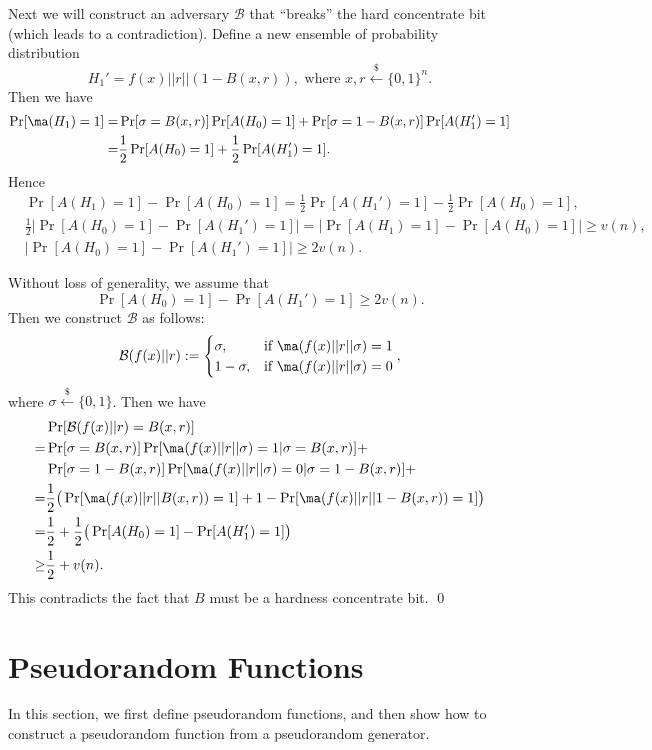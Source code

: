 Next we will construct an adversary $\mathcal{B}$ that ``breaks'' the hard concentrate bit (which leads to a contradiction).
Define a new ensemble of probability distribution
\[
H_1' = f(x) || r || (1-B(x, r)) , \text{ where } x, r \xleftarrow{\$} \{0, 1\}^n.
\]
Then we have
\begin{align*}
\Pr[\ma(H_1) = 1]
=& \Pr[\sigma = B(x, r)] \Pr[A(H_0) = 1] + \Pr[\sigma = 1 - B(x, r)] \Pr[A(H_1') = 1]\\
=& \frac{1}{2} \Pr[A(H_0) = 1] + \frac{1}{2}\Pr[A(H_1') = 1].
\end{align*}
Hence
\begin{align*}
&\Pr[A(H_1) = 1] - \Pr[A(H_0) = 1]
=  \frac{1}{2}\Pr[A(H_1') = 1] - \frac{1}{2} \Pr[A(H_0) = 1],
\\
&\frac{1}{2} \left|\Pr[A(H_0) = 1] - \Pr[A(H_1') = 1] \right|
= \left| \Pr[A(H_1) = 1] - \Pr[A(H_0) = 1] \right|
\geq v(n),
\\
&\left|\Pr[A(H_0) = 1] - \Pr[A(H_1') = 1] \right|
\geq 2v(n).
\end{align*}

Without loss of generality, we assume that
\[
\Pr[A(H_0) = 1] - \Pr[A(H_1') = 1]
\geq 2v(n).
\]
Then we construct $\mathcal{B}$ as follows:
\[
\mathcal{B}(f(x)|| r) :=
\begin{cases}
\sigma, & \text{if } \ma(f(x)|| r||\sigma) = 1\\
1 - \sigma, & \text{if } \ma(f(x)||r|| \sigma) = 0
\end{cases},
\]
where $\sigma \xleftarrow{\$} \{0, 1\}$.
Then we have
\begin{align*}
& \Pr[\mathcal{B}(f(x)|| r) = B(x, r)]\\
=& \Pr[\sigma = B(x, r)] \Pr[ \ma(f(x)|| r||\sigma)=1 | \sigma = B(x, r)] + \\
& \Pr[\sigma = 1 - B(x, r)] \Pr[ \ma(f(x)|| r||\sigma) = 0 | \sigma = 1- B(x, r)] + \\
=& \frac{1}{2} \big( \Pr[\ma(f(x)||r||B(x, r)) = 1] + 1 - \Pr[\ma(f(x)|| r|| 1- B(x, r)) = 1] \big)\\
=& \frac{1}{2} + \frac{1}{2} \big( \Pr[A(H_0) = 1] - \Pr[A(H_1') = 1] \big)\\
\geq & \frac{1}{2} + v(n).
\end{align*}
This contradicts the fact that $B$ must be a hardness concentrate bit.
\qed


\section{Pseudorandom Functions}
In this section, we first define pseudorandom functions, and then show how to  construct a pseudorandom function from a pseudorandom generator.

